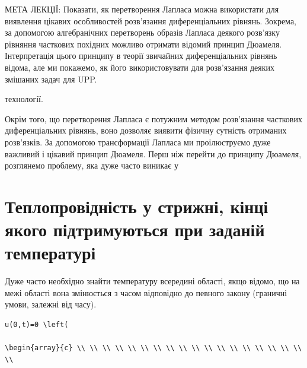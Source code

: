 \documentclass[
  ukrainian,
]{article}
\begin{document}
МЕТА ЛЕКЦІЇ: Показати, як перетворення Лапласа можна використати для
виявлення цікавих особливостей розв'язання диференціальних рівнянь.
Зокрема, за допомогою алгебранічних перетворень образів Лапласа деякого
розв'язку рівняння часткових похідних можливо отримати відомий принцип
Дюамеля. Інтерпретація цього принципу в теорії звичайних диференціальних
рівнянь відома, але ми покажемо, як його використовувати для розв'язання
деяких змішаних задач для UPP.

технології.

Окрім того, що перетворення Лапласа є потужним методом розв'язання
часткових диференціальних рівнянь, воно дозволяє виявити фізичну
сутність отриманих розв'язків. За допомогою трансформації Лапласа ми
проілюструємо дуже важливий і цікавий принцип Дюамеля. Перш ніж перейти
до принципу Дюамеля, розглянемо проблему, яка дуже часто виникає у

\section{Теплопровідність у стрижні, кінці якого підтримуються при
заданій
температурі}\label{ux442ux435ux43fux43bux43eux43fux440ux43eux432ux456ux434ux43dux456ux441ux442ux44c-ux443-ux441ux442ux440ux438ux436ux43dux456-ux43aux456ux43dux446ux456-ux44fux43aux43eux433ux43e-ux43fux456ux434ux442ux440ux438ux43cux443ux44eux442ux44cux441ux44f-ux43fux440ux438-ux437ux430ux434ux430ux43dux456ux439-ux442ux435ux43cux43fux435ux440ux430ux442ux443ux440ux456}

Дуже часто необхідно знайти температуру всередині області, якщо відомо,
що на межі області вона змінюється з часом відповідно до певного закону
(граничні умови, залежні від часу).

\begin{verbatim}
u(0,t)=0 \left(

\begin{array}{c} \\ \\ \\ \\ \\ \\ \\ \\ \\ \\ \\ \\ \\ \\ \\ \\ \\ \\ \\
\end{verbatim}
\end{document}
